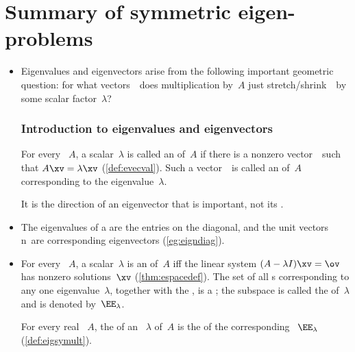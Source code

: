 

\section{Summary of symmetric eigen-problems}
\label{sec:sumevs}


\begin{itemize}
\def\index#1{}%

\item Eigenvalues and eigenvectors arise from the following important geometric question: for what vectors~\vv\ does multiplication by~\(A\) just stretch\slash shrink~\vv\ by some scalar factor~\(\lambda\)?

\subsubsection{Introduction to eigenvalues and eigenvectors}

\itemhi For every ~\(A\),  
a scalar~\(\lambda\) is called an  of~\(A\) if 
there is a nonzero vector~\xv\ such that \(A\xv=\lambda\xv\) (\cref{def:evecval}). 
Such a vector~\xv\ is called an  of~\(A\) corresponding to the eigenvalue~\(\lambda\).   

It is the direction of an eigenvector that is important, not its .

\item The eigenvalues of a  are the entries on the diagonal, and the unit vectors \hlist\ev n\ are corresponding eigenvectors (\cref{eg:eigndiag}). 

\item For every ~\(A\), 
a scalar~\(\lambda\) is an  of~\(A\) iff the  linear system \((A-\lambda I)\xv=\ov\) has nonzero solutions~\(\xv\) (\cref{thm:espacedef}).  
The set of all s corresponding to any one eigenvalue~\(\lambda\), together with the , is a ; the subspace is called the  of~\(\lambda\) and is denoted by~\(\EE_\lambda\).

\itemme For every real ~\(A\), the  of an ~\(\lambda\) of~\(A\) is the  of the corresponding ~\(\EE_\lambda\) (\cref{def:eigsymult}).


\end{itemize}
